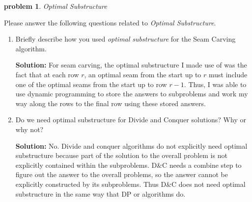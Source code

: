 \documentclass[10pt]{article}
\newcommand{\solution}[1]{\color{blue}\hfill\break\noindent\textbf{Solution:} #1\color{black}}
\newtheorem{problem}{\sc\color{cit}problem}
\begin{document}
\begin{problem}Optimal Substructure\end{problem}
Please answer the following questions related to \emph{Optimal Substructure}.
\begin{enumerate}
    \item Briefly describe how you used \emph{optimal substructure} for the Seam Carving algorithm.
    
    \solution{
        For seam carving, the optimal substructure I made use of was the fact that at each row $r$, an optimal seam from the start up to $r$ must include one of the optimal seams from the start up to row $r-1$. Thus, I was able to use dynamic programming to store the answers to subproblems and work my way along the rows to the final row using these stored answers.
    }
    \item Do we need optimal substructure for Divide and Conquer solutions?  Why or why not?
    
    \solution{
        No. Divide and conquer algorithms do not explicitly need optimal substructure because part of the solution to the overall problem is not explicitly contained within the subproblems. D\&C needs a combine step to figure out the answer to the overall problems, so the answer cannot be explicitly constructed by its subproblems. Thus D\&C does not need optimal substructure in the same way that DP or  algorithms do. 
    }
\end{enumerate}
\end{document}
